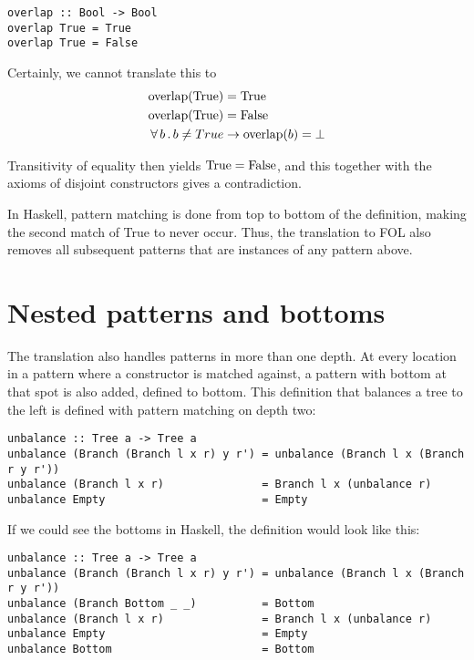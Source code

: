 \begin{verbatim}
overlap :: Bool -> Bool
overlap True = True
overlap True = False
\end{verbatim}

Certainly, we cannot translate this to
\begin{align*}
\mathrm{overlap}(\mathrm{True}) & = \mathrm{True} \\
\mathrm{overlap}(\mathrm{True}) & = \mathrm{False} \\
\forall \, b \, . \, b \neq True & \rightarrow \mathrm{overlap}(b) = \bot
\end{align*}

Transitivity of equality then yields $\mathrm{True} = \mathrm{False}$,
and this together with the axioms of disjoint constructors gives a
contradiction.

In Haskell, pattern matching is done from top to bottom of the
definition, making the second match of True to never occur. Thus, the
translation to FOL also removes all subsequent patterns that are
instances of any pattern above.

\section{Nested patterns and bottoms}

The translation also handles patterns in more than one depth. At every
location in a pattern where a constructor is matched against, a
pattern with bottom at that spot is also added, defined to
bottom. This definition that balances a tree to the left is defined
with pattern matching on depth two:

\begin{verbatim}
unbalance :: Tree a -> Tree a
unbalance (Branch (Branch l x r) y r') = unbalance (Branch l x (Branch r y r'))
unbalance (Branch l x r)               = Branch l x (unbalance r)
unbalance Empty                        = Empty
\end{verbatim}

If we could see the bottoms in Haskell, the definition would look like this:

\begin{verbatim}
unbalance :: Tree a -> Tree a
unbalance (Branch (Branch l x r) y r') = unbalance (Branch l x (Branch r y r'))
unbalance (Branch Bottom _ _)          = Bottom
unbalance (Branch l x r)               = Branch l x (unbalance r)
unbalance Empty                        = Empty
unbalance Bottom                       = Bottom
\end{verbatim}

